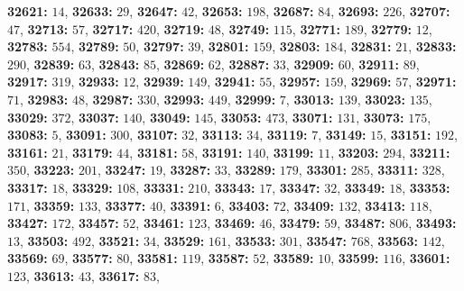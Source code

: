 \textsf{\bfseries 32621:} $14$, \textsf{\bfseries 32633:} $29$, \textsf{\bfseries 32647:} $42$, \textsf{\bfseries 32653:} $198$, \textsf{\bfseries 32687:} $84$, \textsf{\bfseries 32693:} $226$, \textsf{\bfseries 32707:} $47$, \textsf{\bfseries 32713:} $57$, \textsf{\bfseries 32717:} $420$, \textsf{\bfseries 32719:} $48$, \textsf{\bfseries 32749:} $115$, \textsf{\bfseries 32771:} $189$, \textsf{\bfseries 32779:} $12$, \textsf{\bfseries 32783:} $554$, \textsf{\bfseries 32789:} $50$, \textsf{\bfseries 32797:} $39$, \textsf{\bfseries 32801:} $159$, \textsf{\bfseries 32803:} $184$, \textsf{\bfseries 32831:} $21$, \textsf{\bfseries 32833:} $290$, \textsf{\bfseries 32839:} $63$, \textsf{\bfseries 32843:} $85$, \textsf{\bfseries 32869:} $62$, \textsf{\bfseries 32887:} $33$, \textsf{\bfseries 32909:} $60$, \textsf{\bfseries 32911:} $89$, \textsf{\bfseries 32917:} $319$, \textsf{\bfseries 32933:} $12$, \textsf{\bfseries 32939:} $149$, \textsf{\bfseries 32941:} $55$, \textsf{\bfseries 32957:} $159$, \textsf{\bfseries 32969:} $57$, \textsf{\bfseries 32971:} $71$, \textsf{\bfseries 32983:} $48$, \textsf{\bfseries 32987:} $330$, \textsf{\bfseries 32993:} $449$, \textsf{\bfseries 32999:} $7$, \textsf{\bfseries 33013:} $139$, \textsf{\bfseries 33023:} $135$, \textsf{\bfseries 33029:} $372$, \textsf{\bfseries 33037:} $140$, \textsf{\bfseries 33049:} $145$, \textsf{\bfseries 33053:} $473$, \textsf{\bfseries 33071:} $131$, \textsf{\bfseries 33073:} $175$, \textsf{\bfseries 33083:} $5$, \textsf{\bfseries 33091:} $300$, \textsf{\bfseries 33107:} $32$, \textsf{\bfseries 33113:} $34$, \textsf{\bfseries 33119:} $7$, \textsf{\bfseries 33149:} $15$, \textsf{\bfseries 33151:} $192$, \textsf{\bfseries 33161:} $21$, \textsf{\bfseries 33179:} $44$, \textsf{\bfseries 33181:} $58$, \textsf{\bfseries 33191:} $140$, \textsf{\bfseries 33199:} $11$, \textsf{\bfseries 33203:} $294$, \textsf{\bfseries 33211:} $350$, \textsf{\bfseries 33223:} $201$, \textsf{\bfseries 33247:} $19$, \textsf{\bfseries 33287:} $33$, \textsf{\bfseries 33289:} $179$, \textsf{\bfseries 33301:} $285$, \textsf{\bfseries 33311:} $328$, \textsf{\bfseries 33317:} $18$, \textsf{\bfseries 33329:} $108$, \textsf{\bfseries 33331:} $210$, \textsf{\bfseries 33343:} $17$, \textsf{\bfseries 33347:} $32$, \textsf{\bfseries 33349:} $18$, \textsf{\bfseries 33353:} $171$, \textsf{\bfseries 33359:} $133$, \textsf{\bfseries 33377:} $40$, \textsf{\bfseries 33391:} $6$, \textsf{\bfseries 33403:} $72$, \textsf{\bfseries 33409:} $132$, \textsf{\bfseries 33413:} $118$, \textsf{\bfseries 33427:} $172$, \textsf{\bfseries 33457:} $52$, \textsf{\bfseries 33461:} $123$, \textsf{\bfseries 33469:} $46$, \textsf{\bfseries 33479:} $59$, \textsf{\bfseries 33487:} $806$, \textsf{\bfseries 33493:} $13$, \textsf{\bfseries 33503:} $492$, \textsf{\bfseries 33521:} $34$, \textsf{\bfseries 33529:} $161$, \textsf{\bfseries 33533:} $301$, \textsf{\bfseries 33547:} $768$, \textsf{\bfseries 33563:} $142$, \textsf{\bfseries 33569:} $69$, \textsf{\bfseries 33577:} $80$, \textsf{\bfseries 33581:} $119$, \textsf{\bfseries 33587:} $52$, \textsf{\bfseries 33589:} $10$, \textsf{\bfseries 33599:} $116$, \textsf{\bfseries 33601:} $123$, \textsf{\bfseries 33613:} $43$, \textsf{\bfseries 33617:} $83$, 
